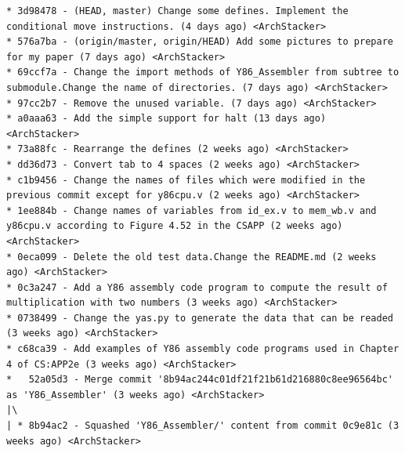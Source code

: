 \begin{verbatim}
* 3d98478 - (HEAD, master) Change some defines. Implement the conditional move instructions. (4 days ago) <ArchStacker>                                                 
* 576a7ba - (origin/master, origin/HEAD) Add some pictures to prepare for my paper (7 days ago) <ArchStacker>                                                           
* 69ccf7a - Change the import methods of Y86_Assembler from subtree to submodule.Change the name of directories. (7 days ago) <ArchStacker>                             
* 97cc2b7 - Remove the unused variable. (7 days ago) <ArchStacker>                                                                                                      
* a0aaa63 - Add the simple support for halt (13 days ago) <ArchStacker>                                                                                                 
* 73a88fc - Rearrange the defines (2 weeks ago) <ArchStacker>                                                                                                           
* dd36d73 - Convert tab to 4 spaces (2 weeks ago) <ArchStacker>                                                                                                         
* c1b9456 - Change the names of files which were modified in the previous commit except for y86cpu.v (2 weeks ago) <ArchStacker>                                        
* 1ee884b - Change names of variables from id_ex.v to mem_wb.v and y86cpu.v according to Figure 4.52 in the CSAPP (2 weeks ago) <ArchStacker>                           
* 0eca099 - Delete the old test data.Change the README.md (2 weeks ago) <ArchStacker>                                                                                   
* 0c3a247 - Add a Y86 assembly code program to compute the result of multiplication with two numbers (3 weeks ago) <ArchStacker>                                        
* 0738499 - Change the yas.py to generate the data that can be readed (3 weeks ago) <ArchStacker>                                                                       
* c68ca39 - Add examples of Y86 assembly code programs used in Chapter 4 of CS:APP2e (3 weeks ago) <ArchStacker>                                                        
*   52a05d3 - Merge commit '8b94ac244c01df21f21b61d216880c8ee96564bc' as 'Y86_Assembler' (3 weeks ago) <ArchStacker>                                                    
|\                                                                                                                                                                      
| * 8b94ac2 - Squashed 'Y86_Assembler/' content from commit 0c9e81c (3 weeks ago) <ArchStacker>                                                                         

\end{verbatim}

